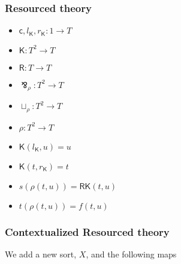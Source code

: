 \documentclass{llncs}
\renewcommand{\:}{\colon}
\begin{document}
\subsubsection{Resourced theory}
\begin{itemize}
  \item $\mathsf{c}, l_{\mathsf{K}}, r_{\mathsf{K}} : 1 \rightarrow T$
  \item $\mathsf{K} : T^{2} \rightarrow T$
  \item $\mathsf{R} : T \rightarrow T$
  \item $\bindnasrepma_{\rho} : T^{2} \rightarrow T$
  \item $\sqcup_{\rho} : T^{2} \rightarrow T$
  \item $\rho : T^{2} \rightarrow T$             %
  \item $\mathsf{K}(l_{\mathsf{K}}, u) = u$
  \item $\mathsf{K}(t, r_{\mathsf{K}}) = t$
  \item $s(\rho(t,u)) = \mathsf{R}\mathsf{K}(t, u)$
  \item $t(\rho(t,u)) = f(t,u)$                    %
\end{itemize}

\subsubsection{Contextualized Resourced theory}
We add a new sort, $X$, and the following maps
\end{document}
